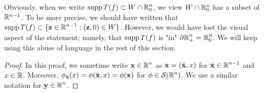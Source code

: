 \begin{rmk}
Obviously, when we write
$\displaystyle \operatorname{supp} T(f) \subset W \cap \mathbb{R}^n_0$, 
we view $W \cap \mathbb{R}^n_0$ has a subset of $\mathbb{R}^{n-1}$.  To be more
precise, we should have written that
$\displaystyle \operatorname{supp} T(f) \subset \{ \mathbf{z} \in \mathbb{R}^{n-1}:
(\mathbf{z},0) \in W \}$.
However, we would have lost the visual
aspect of the statement; namely, that
$\displaystyle \operatorname{supp} T(f)$ is "in" $\displaystyle \partial \mathbb{R}^n_+ = \mathbb{R}^n_0$.
We will keep using this abuse of language in the rest of this section.
\end{rmk}

\begin{proof}
In this proof, we sometime write $\displaystyle \mathbf{x}\in \mathbb{R}^n$ as
$\mathbf{x} = (\breve{\mathbf{x}}, x)$ for
$\displaystyle \breve{\mathbf{x}}\in \mathbb{R}^{n-1}$ and $x\in \mathbb{R}$.
Moreover,
$\phi_{\breve{\mathbf{x}}}(x) = \phi(\breve{\mathbf{x}},x) = \phi(\mathbf{x})$ for
$\displaystyle \phi \in \mathcal{S}(\mathbb{R}^n)$.  We use a similar notation for
$\displaystyle \mathbf{y} \in \mathbb{R}^n$.


\end{proof}
